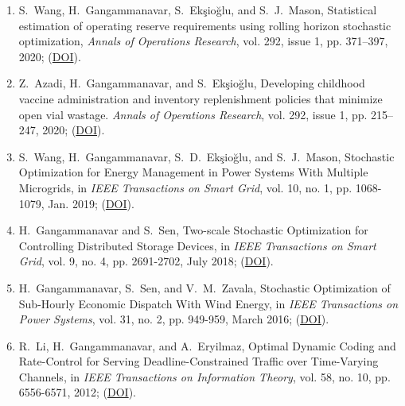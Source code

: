 \documentclass[hyperref, margin]{myResume}
\begin{document}
\begin{resume}
\begin{enumerate}[label=J\arabic*., leftmargin=*]
	\item S.\ Wang\footnotemark[3], H.\ Gangammanavar, S.\ Ek{\c{s}}io{\u{g}}lu, and S.\ J.\ Mason, Statistical estimation of operating reserve requirements using rolling horizon stochastic optimization, \textit{Annals of Operations Research}, vol. 292, issue 1, pp. 371–397, 2020; (\href{https://doi.org/10.1007/s10479-019-03482-x}{DOI}).

	\item Z.\ Azadi\footnotemark[3], H.\ Gangammanavar, and S.\ Ek{\c{s}}io{\u{g}}lu, Developing childhood vaccine administration and inventory replenishment policies that minimize open vial wastage. \textit{Annals of Operations Research}, vol. 292, issue 1, pp. 215–247, 2020; (\href{https://doi.org/10.1007/s10479-019-03164-8}{DOI}).

	\item S.\ Wang\footnotemark[3], H.\ Gangammanavar, S.\ D.\ Ek{\c{s}}io{\u{g}}lu, and S.\ J.\ Mason, Stochastic Optimization for Energy Management in Power Systems With Multiple Microgrids, in {\it IEEE Transactions on Smart Grid}, vol. 10, no. 1, pp. 1068-1079, Jan. 2019; (\href{https://doi.org/10.1109/TSG.2017.2759159}{DOI}).

	\item H.\ Gangammanavar and S.\ Sen, Two-scale Stochastic Optimization for Controlling Distributed Storage Devices, in \textit{IEEE Transactions on Smart Grid}, vol. 9, no. 4, pp. 2691-2702, July 2018; (\href{https://doi.org/10.1109/TSG.2016.2616881}{DOI}).

	\item H.\ Gangammanavar, S.\ Sen, and V.\ M.\ Zavala, Stochastic Optimization of Sub-Hourly Economic Dispatch With Wind Energy, in \textit{IEEE Transactions on Power Systems}, vol. 31, no. 2, pp. 949-959, March 2016; (\href{https://doi.org/10.1109/TPWRS.2015.2410301}{DOI}).
	
	\item R.\ Li, H.\ Gangammanavar, and A.\ Eryilmaz, Optimal Dynamic Coding and Rate-Control for Serving Deadline-Constrained Traffic over Time-Varying Channels, in \textit{IEEE Transactions on Information Theory}, vol. 58, no. 10, pp. 6556-6571, 2012; (\href{https://doi.org/10.1109/TIT.2012.2204031}{DOI}).
\end{enumerate}


\end{resume}
\end{document}
